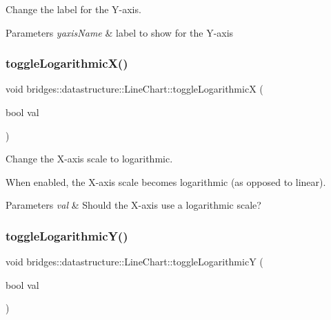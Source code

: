 Change the label for the Y-\/axis. 


\begin{DoxyParams}{Parameters}
{\em yaxis\+Name} & label to show for the Y-\/axis \\
\hline
\end{DoxyParams}
\mbox{\label{classbridges_1_1datastructure_1_1_line_chart_a4e2aa224d793793faa0c5a6edb729646}} 
\subsubsection{\texorpdfstring{toggleLogarithmicX()}{toggleLogarithmicX()}}
{\footnotesize\ttfamily void bridges\+::datastructure\+::\+Line\+Chart\+::toggle\+LogarithmicX (\begin{DoxyParamCaption}\item[{bool}]{val }\end{DoxyParamCaption})\hspace{0.3cm}{\ttfamily [inline]}}



Change the X-\/axis scale to logarithmic. 

When enabled, the X-\/axis scale becomes logarithmic (as opposed to linear).


\begin{DoxyParams}{Parameters}
{\em val} & Should the X-\/axis use a logarithmic scale? \\
\hline
\end{DoxyParams}
\mbox{\label{classbridges_1_1datastructure_1_1_line_chart_a30c72748323d3da25974b30e11e46f48}} 
\subsubsection{\texorpdfstring{toggleLogarithmicY()}{toggleLogarithmicY()}}
{\footnotesize\ttfamily void bridges\+::datastructure\+::\+Line\+Chart\+::toggle\+LogarithmicY (\begin{DoxyParamCaption}\item[{bool}]{val }\end{DoxyParamCaption})\hspace{0.3cm}{\ttfamily [inline]}}



